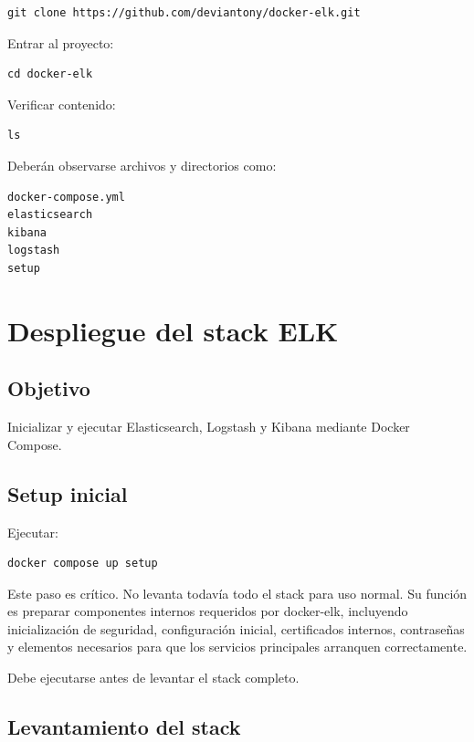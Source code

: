 \documentclass[
  coursetitle={Cómputo Nube y Tecnologías Emergentes},
  coursehours={96},
  coursedate={Verano 2026},
  doctype={Práctica},
  otherlangs={english,french},
  authorname={Lázaro},
  authorsurname={Bustio-Martínez},
  authortitle={PhD},
  role={Profesor Investigador},
  email={lbustio@inaoe.mx},
  phone={5559504000},
  ext={7459},
  institution={Instituto Nacional de Astrofísica, Óptica y Electrónica (INAOE)},
  department={Maestría en Ciencias en Tecnologías de Seguridad},
  address={Luis Enrique Erro 1, Sta. Ma. Tonantzintla, San Andrés Cholula, CP 72840, Puebla, México},
  margin={0.5in}
]{../../lbustio_lecture_notes}
\begin{document}
\begin{lstlisting}
git clone https://github.com/deviantony/docker-elk.git
\end{lstlisting}

Entrar al proyecto:

\begin{lstlisting}
cd docker-elk
\end{lstlisting}

Verificar contenido:

\begin{lstlisting}
ls
\end{lstlisting}

Deberán observarse archivos y directorios como:

\begin{verbatim}
docker-compose.yml
elasticsearch
kibana
logstash
setup
\end{verbatim}

\section{Despliegue del stack ELK}

\subsection{Objetivo}

Inicializar y ejecutar Elasticsearch, Logstash y Kibana mediante Docker Compose.

\subsection{Setup inicial}

Ejecutar:

\begin{lstlisting}
docker compose up setup
\end{lstlisting}

Este paso es crítico. No levanta todavía todo el stack para uso normal. Su función es preparar componentes internos requeridos por docker-elk, incluyendo inicialización de seguridad, configuración inicial, certificados internos, contraseñas y elementos necesarios para que los servicios principales arranquen correctamente.

Debe ejecutarse antes de levantar el stack completo.

\subsection{Levantamiento del stack}
\end{document}
